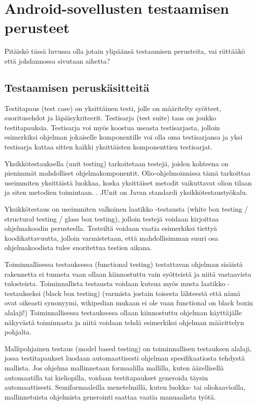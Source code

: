 \section{Android-sovellusten testaamisen perusteet}

Pitäiskö tässä luvussa olla jotain ylipäänsä testaamisen perusteita, vai riittääkö että johdannossa sivutaan aihetta?

\subsection{Testaamisen peruskäsitteitä}

Testitapaus (test case) on yksittäinen testi, jolle on määritelty syötteet, suoritusehdot ja läpäisykriteerit. Testisarja (test suite) taas on joukko testitapauksia. Testisarja voi myös koostua useasta testisarjasta, jolloin esimerkiksi ohjelman jokaiselle komponentille voi olla oma testisarjansa ja yksi testisarja kattaa sitten kaikki yksittäisten komponenttien testisarjat. \cite[153]{testing}

Yksikkötestauksella (unit testing) tarkoitetaan testejä, joiden kohteena on pienimmät mahdolliset ohjelmakomponentit. Olio-ohjelmoinnissa tämä tarkoittaa useimmiten yksittäistä luokkaa, koska yksittäiset metodit vaikuttavat olion tilaan ja siten metodien toimintaan. \cite[282-286]{testing}. JUnit \cite{junit} on Javan standardi yksikkötestaustyökalu.

Yksikkötestaus on useimmiten valkoinen laatikko -testausta (white box testing / structural testing / glass box testing), jolloin testejä voidaan kirjoittaa ohjelmakoodin perusteella. Testeiltä voidaan vaatia esimerkiksi tiettyä koodikattavuutta, jolloin varmistetaan, että mahdollisimman suuri osa ohjelmakoodista tulee suoritettua testien aikana. \cite[154]{testing}

Toiminnallisessa testauksessa (functional testing) testattavan ohjelman sisäistä rakennetta ei tunneta vaan ollaan kiinnostuttu vain syötteistä ja niitä vastaavista tulosteista. Toiminnallista testausta voidaan kutsua myös musta laatikko -testaukseksi (black box testing) (varmista jostain toisesta lähteestä että nämä ovat oikeasti synonyymi, wikipedian mukaan ei ole vaan functional on black boxin alalaji!) Toiminnallisessa testauksessa ollaan kiinnostuttu ohjelman käyttäjälle näkyvästä toiminnasta ja niitä voidaan tehdä esimerkiksi ohjelman määrittelyn pohjalta. \cite[161-162]{testing}

Mallipohjainen testaus (model based testing) on toiminnallisen testauksen alalaji, jossa testitapaukset luodaan automaattisesti ohjelman spesifikaatiosta tehdystä mallista. Jos ohjelma mallinnetaan formaalilla mallilla, kuten äärellisellä automaatilla tai kieliopilla, voidaan testitapaukset generoida täysin automaattisesti. Semiformaaleilla menetelmillä, kuten luokka- tai oliokaavioilla, mallinnetuista ohjelmista generointi saattaa vaatia manuaalista työtä. \cite[245-250]{testing}


